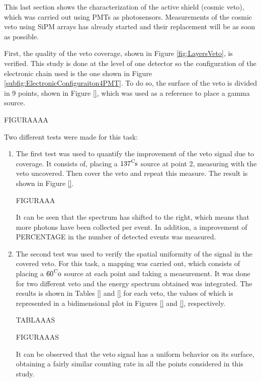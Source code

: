 This last section shows the characterization of the active shield (cosmic veto), which was carried out using PMTs as photosensors. Measurements of the cosmic veto using SiPM arrays has already started and their replacement will be as soon as possible. 

First, the quality of the veto coverage, shown in Figure \ref{fig:LayersVeto}, is verified. This study is done at the level of one detector so the configuration of the electronic chain used is the one shown in Figure \ref{subfig:ElectronicConfiguraiton4PMT}. To do so, the surface of the veto is divided in 9 points, shown in Figure \ref{}, which was used as a reference to place a gamma source.

FIGURAAAA

Two different tests were made for this task:
\begin{enumerate}

\item{} The first test was used to quantify the improvement of the veto signal due to coverage. It consists of, placing a $\ce{{137}^Cs}$ source at point 2, measuring with the veto uncovered. Then cover the veto and repeat this measure. The result is shown in Figure \ref{}.

FIGURAAA

It can be seen that the spectrum has shifted to the right, which means that more photons have been collected per event. In addition, a improvement of PERCENTAGE in the number of detected events was measured.


\item{} The second test was used to verify the spatial uniformity of the signal in the covered veto. For this task, a mapping was carried out, which consists of placing a $\ce{{60}^Co}$ source at each point and taking a measurement. It was done for two different veto and the energy spectrum obtained was integrated. The results is shown in Tables \ref{} and \ref{} for each veto, the values of which is represented in a bidimensional plot in Figures \ref{} and \ref{}, respectively.

TABLAAAS

FIGURAAAS

It can be observed that the veto signal has a uniform behavior on its surface, obtaining a fairly similar counting rate in all the points considered in this study.

\end{enumerate}

